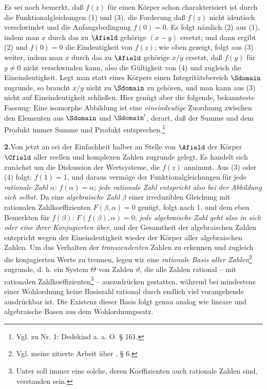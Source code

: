 Es sei noch bemerkt, daß \(f(z)\) für einen Körper schon charakterisiert ist durch die Funktionalgleichungen (1) und (3), die Forderung daß \(f(z)\) nicht identisch verschwindet und die Anfangsbedingung \(f(0)=0\). Es folgt nämlich (2) aus (1), indem man \(x\) durch das zu \(\Afield\) gehörige \((x-y)\) ersetzt; und dann ergibt (2) und \(f(0)=0\) die Eindeutigkeit von \(f(z)\); wie oben gezeigt, folgt aus (3) weiter, indem man \(x\) durch das zu \(\Afield\) gehörige \(x/y\) ersetzt, daß \(f(y)\) für \(y\ne0\) nicht verschwinden kann, also die Gültigkeit von (4) und zugleich die Eineindeutigkeit. Legt man statt eines Körpers einen Integritätsbereich \(\Sdomain\) zugrunde, so braucht \(x/y\) nicht zu \(\Sdomain\) zu gehören, und man kann aus (3) nicht auf Eineindeutigkeit schließen. Hier genügt aber die folgende, bekannteste Fassung: Eine isomorphe Abbildung ist eine \emph{eineindeutige} Zuordnung zwischen den Elementen aus \(\Sdomain\) und \(\Sdomain'\), derart, daß der Summe und dem Produkt immer Summe und Produkt entsprechen.\footnote{Vgl. zu Nr. 1: Dedekind a. a. O. § 161.}

\medskip
\noindent\textbf{2.}\quad Von jetzt an sei der Einfachheit halber an Stelle von \(\Afield\) der Körper \(\Cfield\) aller reellen und komplexen Zahlen zugrunde gelegt. Es handelt sich zunächst um die Diskussion der Wertsysteme, die \(f(z)\) annimmt. Aus (3) oder (4) folgt: \(f(1)=1\), und daraus vermöge der Funktionalgleichungen für jede \emph{rationale Zahl} \(\alpha\): \(f(\alpha)=\alpha\); \emph{jede rationale Zahl entspricht also bei der Abbildung sich selbst.} Da eine \emph{algebraische Zahl} \(\beta\) einer irreduziblen Gleichung mit rationalen Zahlkoeffizienten \(F(\beta,\alpha)=0\) genügt, folgt nach 1. und dem eben Bemerkten für \(f(\beta)\): \(F(f(\beta),\alpha)=0\); \emph{jede algebraische Zahl geht also in sich oder eine ihrer Konjugierten über}, und der Gesamtheit der algebraischen Zahlen entspricht wegen der Eineindeutigkeit wieder der Körper aller algebraischen Zahlen. Um das Verhalten der \emph{transzendenten} Zahlen zu erkennen und zugleich die konjugierten Werte zu trennen, legen wir eine \emph{rationale Basis aller Zahlen}\footnote{Vgl. meine zitierte Arbeit über , § 6.} zugrunde, d. h. ein System \(\Theta\) von Zahlen \(\vartheta\), die alle Zahlen rational -- mit rationalen Zahlkoeffizienten\footnote{Unter  soll immer eine solche, deren Koeffizienten auch rationale Zahlen sind, verstanden sein.} -- auszudrücken gestatten, während bei mindestens einer Wohlordnung keine Basiszahl rational durch endlich viel vorangehende ausdrückbar ist. Die Existenz dieser Basis folgt genau analog wie lineare und algebraische Basen aus dem Wohlordnungssatz.

